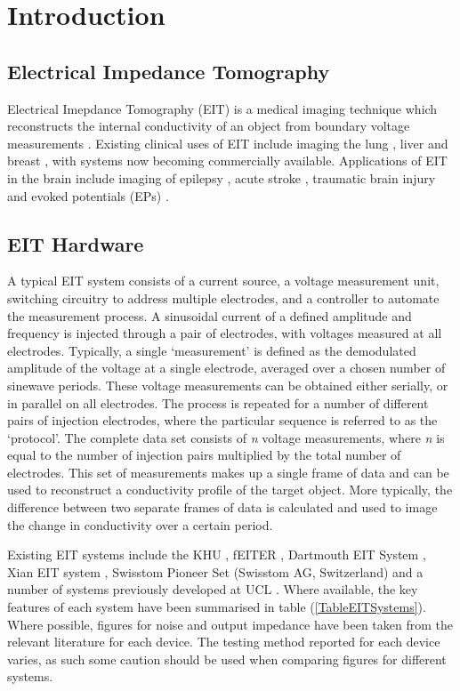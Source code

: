\section{Introduction}

\subsection{Electrical Impedance Tomography}
Electrical Imepdance Tomography (EIT) is a medical imaging technique which reconstructs the internal conductivity of an object from boundary voltage measurements \cite{Metherall1996}. Existing clinical uses of EIT include imaging the lung \cite{Frerichs_2000}, liver \cite{YOU_2009} and breast \cite{Halter}, with systems now becoming commercially available. Applications of EIT in the brain include imaging of epilepsy \cite{Vongerichten_2016,Fabrizi_2006}, acute stroke \cite{Dowrick_2016}, traumatic brain injury \cite{Manwaring2013} and evoked potentials (EPs) \cite{Aristovich_2016}. 
\subsection{EIT Hardware}

A typical EIT system consists of a current source, a voltage measurement unit, switching circuitry to address multiple electrodes, and a controller to automate the measurement process. A sinusoidal current of a defined amplitude and frequency is injected through a pair of electrodes, with voltages measured at all electrodes. Typically, a single `measurement' is defined as the demodulated amplitude of the voltage at a single electrode, averaged over a chosen number of sinewave periods. These voltage measurements can be obtained either serially, or in parallel on all electrodes. The process is repeated for a number of different pairs of injection electrodes, where the particular sequence is referred to as the `protocol'. The complete data set consists of \emph{n} voltage measurements, where \emph{n} is equal to the number of injection pairs multiplied by the total number of electrodes. This set of measurements makes up a single frame of data and can be used to reconstruct a conductivity profile of the target object. More typically, the difference between two separate frames of data is calculated and used to image the change in conductivity over a certain period.

Existing EIT systems include the KHU \cite{Hun_Wi_2014}, fEITER \cite{McCann_2011}, Dartmouth EIT System \cite{khan}, Xian EIT system \cite{Shi_Xuetao_2005}, Swisstom Pioneer Set (Swisstom AG, Switzerland) and a number of systems previously developed at UCL \cite{Oh2011} \cite{McEwan_2006}. Where available, the key features of each system have been summarised in table (\ref{TableEITSystems}). Where possible, 
figures for noise and output impedance have been taken from the relevant literature for each device. The testing method reported for each device varies, as such some caution should be used when comparing figures for different systems.

